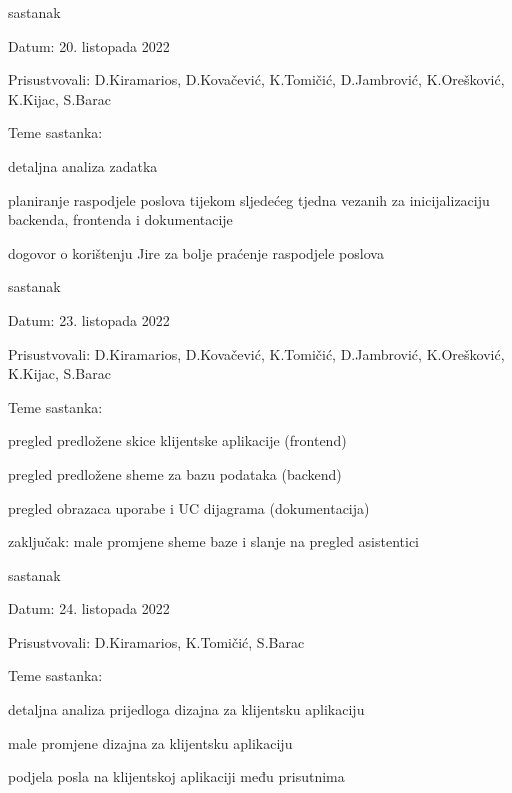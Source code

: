 \begin{packed_enum}
			\item  sastanak
			\item[] \begin{packed_item}
				\item Datum: 20. listopada 2022
				\item Prisustvovali: D.Kiramarios, D.Kovačević, K.Tomičić, D.Jambrović, K.Orešković, K.Kijac, S.Barac
				\item Teme sastanka:
				\begin{packed_item}
					\item  detaljna analiza zadatka
					\item  planiranje raspodjele poslova tijekom sljedećeg tjedna vezanih za inicijalizaciju backenda, frontenda i dokumentacije
					\item  dogovor o korištenju Jire za bolje praćenje raspodjele poslova
				\end{packed_item}
			\end{packed_item}

			\eject

			\item  sastanak
			\item[] \begin{packed_item}
				\item Datum: 23. listopada 2022
				\item Prisustvovali: D.Kiramarios, D.Kovačević, K.Tomičić, D.Jambrović, K.Orešković, K.Kijac, S.Barac
				\item Teme sastanka:
				\begin{packed_item}
					\item  pregled predložene skice klijentske aplikacije (frontend)
					\item  pregled predložene sheme za bazu podataka (backend)
					\item  pregled obrazaca uporabe i UC dijagrama (dokumentacija)
					\item  zaključak: male promjene sheme baze i slanje na pregled asistentici
				\end{packed_item}
			\end{packed_item}

			\item  sastanak
			\item[] \begin{packed_item}
				\item Datum: 24. listopada 2022
				\item Prisustvovali: D.Kiramarios, K.Tomičić, S.Barac
				\item Teme sastanka:
				\begin{packed_item}
					\item  detaljna analiza prijedloga dizajna za klijentsku aplikaciju
					\item  male promjene dizajna za klijentsku aplikaciju
					\item  podjela posla na klijentskoj aplikaciji među prisutnima
				\end{packed_item}
			\end{packed_item}


\end{packed_enum}
